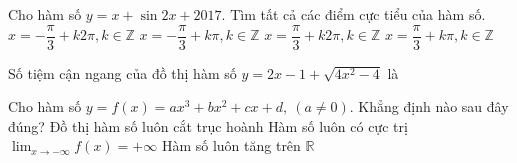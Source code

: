 \begin{ex}%
Cho hàm số $y=x+\sin2x+2017$. Tìm tất cả các điểm cực tiểu của hàm số.
\choice
{$x=-\dfrac{\pi}{3}+k2\pi, k \in \mathbb{Z}$}
{\True $x=-\dfrac{\pi}{3}+k\pi, k \in \mathbb{Z}$}
{$x=\dfrac{\pi}{3}+k2\pi, k \in \mathbb{Z}$}
{$x=\dfrac{\pi}{3}+k\pi, k \in \mathbb{Z}$}
\end{ex}

\begin{ex}%
Số tiệm cận ngang của đồ thị hàm số $y=2x-1+\sqrt{4x^2-4}$ là
\end{ex}

\begin{ex}%
Cho hàm số $y=f(x)=ax^3+bx^2+cx+d, \ (a \ne 0)$. Khẳng định nào sau đây đúng?
\choice
{\True Đồ thị hàm số luôn cắt trục hoành}
{Hàm số luôn có cực trị}
{$\displaystyle \lim_{x \to -\infty}{f(x)}=+\infty$}
{Hàm số luôn tăng trên $\mathbb{R}$}
\end{ex}

